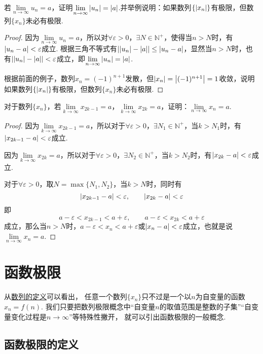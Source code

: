 \begin{example}
\def\l{\lim\limits_{n\to\infty}}
若\(\l u_n = a\)，证明\(\l \abs{u_n} = \abs{a}\).并举例说明：如果数列\(\{\abs{x_n}\}\)有极限，但数列\(\{x_n\}\)未必有极限.
\begin{proof}
因为\(\l u_n = a\)，所以对\(\forall\varepsilon>0\)，\(\exists N \in \mathbb{N}^+\)，使得当\(n>N\)时，有\(\abs{u_n-a}<\varepsilon\)成立.
根据三角不等式有\(\abs{\abs{u_n}-\abs{a}} \leq \abs{u_n-a}\)，显然当\(n>N\)时，也有\(\abs{\abs{u_n}-\abs{a}}<\varepsilon\)成立，即\(\l \abs{u_n} = \abs{a}\).

根据前面的例子，数列\(x_n = (-1)^{n+1}\)发散，但\(\abs{x_n} = \abs{(-1)^{n+1}} = 1\)收敛，说明如果数列\(\{\abs{x_n}\}\)有极限，但数列\(\{x_n\}\)未必有极限.
\end{proof}
\end{example}

\begin{example}
\def\l#1{\lim\limits_{#1\to\infty}}
对于数列\(\{x_n\}\)，若\(\l{k}x_{2k-1}=a\)，\(\l{k}x_{2k}=a\)，证明：\(\l{n}x_n=a\).
\begin{proof}
因为\(\l{k}x_{2k-1}=a\)，所以对于\(\forall\varepsilon>0\)，\(\exists N_1 \in \mathbb{N}^+\)，当\(k>N_1\)时，有\(\abs{x_{2k-1}-a}<\varepsilon\)成立.

因为\(\l{k}x_{2k}=a\)，所以对于\(\forall\varepsilon>0\)，\(\exists N_2 \in \mathbb{N}^+\)，当\(k>N_2\)时，有\(\abs{x_{2k}-a}<\varepsilon\)成立.

对于\(\forall\varepsilon>0\)，取\(N = \max\{N_1,N_2\}\)，当\(k>N\)时，同时有\[
\abs{x_{2k-1}-a}<\varepsilon, \qquad \abs{x_{2k}-a}<\varepsilon
\]即\[
a-\varepsilon<x_{2k-1}<a+\varepsilon, \qquad a-\varepsilon<x_{2k}<a+\varepsilon
\]成立，那么当\(n>N\)时，\(a-\varepsilon<x_n<a+\varepsilon\)或\(\abs{x_n-a}<\varepsilon\)成立，也就是说\(\l{n}x_n=a\).
\end{proof}
\end{example}

\section{函数极限}
从\hyperref[definition.数列.数列的定义]{数列的定义}可以看出，
任意一个数列\(\{x_n\}\)只不过是一个以\(n\)为自变量的函数\(x_n = f(n)\).
我们只要把数列极限概念中“自变量\(n\)的取值范围是整数的子集”“自变量变化过程是\(n\to\infty\)”等特殊性撇开，
就可以引出函数极限的一般概念.

\subsection{函数极限的定义}
